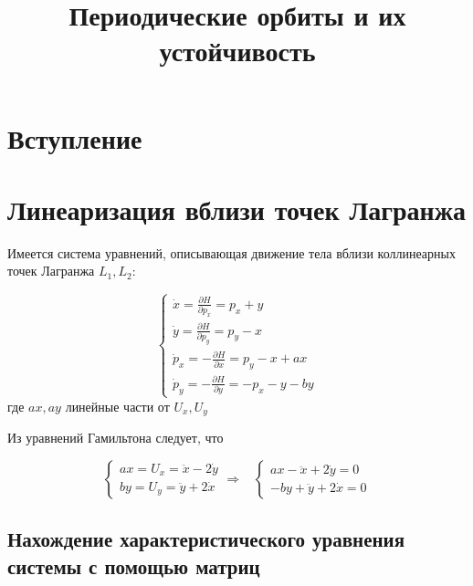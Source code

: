 \documentclass[12pt, a4paper]{article}
\title{Периодические орбиты и их устойчивость}
\date{}
\author{}
\begin{document}
    \maketitle
    \tableofcontents
    \newpage


    \section{Вступление}


    \section{Линеаризация вблизи точек Лагранжа}

    Имеется система уравнений, описывающая движение тела вблизи коллинеарных точек Лагранжа  $L_1, L_2$:

    \begin{equation}
        \label{eq:linear}
        \begin{cases}
            \dot x = \frac{\partial H}{\partial p_x} = p_x + y\\
            \dot y = \frac{\partial H}{\partial p_y} = p_y - x\\
            \dot p_x = - \frac{\partial H}{\partial x} = p_y - x + ax\\
            \dot p_y = - \frac{\partial H}{\partial y} = - p_x - y - by
        \end{cases}
    \end{equation}
    где $ax, ay$ линейные части от $U_x, U_y$

    Из уравнений Гамильтона следует, что

    \begin{equation}
        \begin{cases}
            ax = U_x = \ddot x - 2 \dot y\\
            by = U_y = \ddot y + 2 \dot x
        \end{cases}
        \Rightarrow
        \;\;\;
        \begin{cases}
            ax - \ddot x + 2 \dot y = 0\\
            - by + \ddot y + 2 \dot x = 0
        \end{cases}
    \end{equation}

    \subsection{Нахождение характеристического уравнения системы с помощью матриц}
\end{document}
